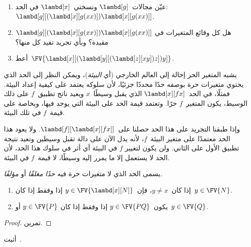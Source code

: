 \documentclass[../../../include/open-logic-section]{subfiles}
\begin{document}
\begin{prob}
  \begin{enumerate}
  \item عيّن مجالات~$\lambd[g]$ ونسختي~$\lambd[x]$ في الحد:
    $\lambd[g][(\lambd[x][g (x x)]) \lambd[x][g (x x)]]$.
  \item هل كل وقائع المتغيرات في
    $\lambd[g][(\lambd[x][g (x x)]) \lambd[x][g (x x)]]$ مقيدة؟ وبأي
    تجريد تقيد كل منها؟
    \item أعط~$\FV{\lambd[x][(\lambd[y][(\lambd[z][x y]) z]) y]}$.
  \end{enumerate}
\end{prob}

\begin{explain}
يشبه المتغير الحر إحالة إلى العالم الخارجي (أي \emph{البيئة})، ويمكن النظر
إلى الحد الذي يحتوي متغيرات حرة بوصفه حدًا محددًا جزئيًا، لأن سلوكه يعتمد
على كيفية إعداد البيئة. فمثلًا، في الحد~$\lambd[x][f x]$ الذي يقبل
وسيطًا~$x$ ويعيد ناتج تطبيق~$f$ على ذلك الوسيط، يكون المتغير~$f$ حرًا. وتعتمد قيمة الحد
على البيئة التي يوجد فيها، وبخاصة على قيمة~$f$ في تلك البيئة.

وإذا طبقنا التجريد على هذا الحد حصلنا على~$\lambd[f][\lambd[x][f
    x]]$. ولا يعود هذا الحد معتمدًا على متغير البيئة~$f$، لأنه يدل الآن
على دالة تقبل وسيطين وتعيد نتيجة تطبيق الأول على الثاني. ولن يكون لتغيير
$f$ في البيئة أي أثر في سلوك هذا الحد، لأن الحد لا يستعمل إلا ما يمرر
إليه وسيطًا، لا قيمة~$f$ في البيئة.
\end{explain}

\begin{defn}
  يسمى الحد الذي لا متغيرات حرة فيه \emph{حدًا مغلقًا} أو
  \emph{مؤلفًا}.
\end{defn}

\begin{lem}
  \begin{enumerate}
    \item {} إذا كان~$y \neq x$، فإن~$y \in
      \FV{\lambd[x][N]}$ إذا وفقط إذا كان~$y \in \FV{N}$.
    \item {} يكون~$y \in \FV{PQ}$ إذا وفقط إذا كان
      $y \in \FV{P}$ أو~$y \in \FV{Q}$.
    \end{enumerate}
\end{lem}

\begin{proof}
  تمرين.
\end{proof}

\begin{prob}
  أثبت~.
\end{prob}
\end{document}

